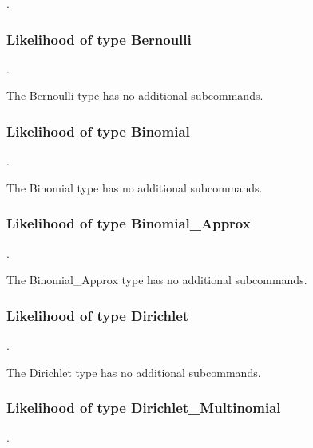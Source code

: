 .
\label{syntax:Likelihood}

\subsubsection{Likelihood of type Bernoulli}
.
\label{syntax:Likelihood-Bernoulli}

The Bernoulli type has no additional subcommands.
\subsubsection{Likelihood of type Binomial}
.
\label{syntax:Likelihood-Binomial}

The Binomial type has no additional subcommands.
\subsubsection{Likelihood of type Binomial\_Approx}
.
\label{syntax:Likelihood-BinomialApprox}

The Binomial\_Approx type has no additional subcommands.
\subsubsection{Likelihood of type Dirichlet}
.
\label{syntax:Likelihood-Dirichlet}

The Dirichlet type has no additional subcommands.
\subsubsection{Likelihood of type Dirichlet\_Multinomial}
.
\label{syntax:Likelihood-DirichletMultinomial}




